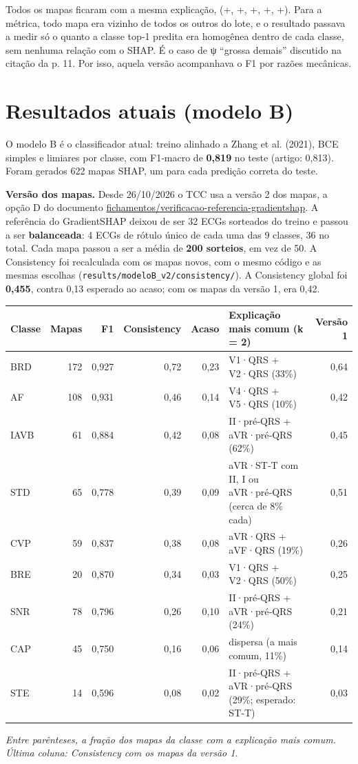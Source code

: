 \documentclass[11pt,a4paper]{article}
\begin{document}
Todos os mapas ficaram com a mesma explicação, (+, +, +, +, +). Para a métrica, todo mapa era vizinho de todos os outros do lote, e o resultado passava a medir só o quanto a classe top‑1 predita era homogênea dentro de cada classe, sem nenhuma relação com o SHAP. É o caso de ψ “grossa demais” discutido na citação da p. 11. Por isso, aquela versão acompanhava o F1 por razões mecânicas.

\section{Resultados atuais (modelo B)}

O modelo B é o classificador atual: treino alinhado a Zhang et al. (2021), BCE simples e limiares por classe, com F1‑macro de \textbf{0,819} no teste (artigo: 0,813). Foram gerados 622 mapas SHAP, um para cada predição correta do teste.

\textbf{Versão dos mapas.} Desde 26/10/2026 o TCC usa a versão 2 dos mapas, a opção D do documento \url{fichamentos/verificacao-referencia-gradientshap}. A referência do GradientSHAP deixou de ser 32 ECGs sorteados do treino e passou a ser \textbf{balanceada}: 4 ECGs de rótulo único de cada uma das 9 classes, 36 no total. Cada mapa passou a ser a média de \textbf{200 sorteios}, em vez de 50. A Consistency foi recalculada com os mapas novos, com o mesmo código e as mesmas escolhas (\texttt{results/modeloB\_v2/consistency/}). A Consistency global foi \textbf{0,455}, contra 0,13 esperado ao acaso; com os mapas da versão 1, era 0,42.

\begin{center}\small
\begin{tabularx}{\linewidth}{lrrrrXr}
\toprule
\textbf{Classe} & \textbf{Mapas} & \textbf{F1} & \textbf{Consistency} & \textbf{Acaso} & \textbf{Explicação mais comum (k = 2)} & \textbf{Versão 1} \\
\midrule
BRD & 172 & 0,927 & 0,72 & 0,23 & V1·QRS + V2·QRS (33\%) & 0,64 \\
AF & 108 & 0,931 & 0,46 & 0,14 & V4·QRS + V5·QRS (10\%) & 0,42 \\
IAVB & 61 & 0,884 & 0,42 & 0,08 & II·pré‑QRS + aVR·pré‑QRS (62\%) & 0,45 \\
STD & 65 & 0,778 & 0,39 & 0,09 & aVR·ST‑T com II, I ou aVR·pré‑QRS (cerca de 8\% cada) & 0,51 \\
CVP & 59 & 0,837 & 0,38 & 0,08 & aVR·QRS + aVF·QRS (19\%) & 0,26 \\
BRE & 20 & 0,870 & 0,34 & 0,03 & V1·QRS + V2·QRS (50\%) & 0,25 \\
SNR & 78 & 0,796 & 0,26 & 0,10 & II·pré‑QRS + aVR·pré‑QRS (24\%) & 0,21 \\
CAP & 45 & 0,750 & 0,16 & 0,06 & dispersa (a mais comum, 11\%) & 0,14 \\
STE & 14 & 0,596 & 0,08 & 0,02 & II·pré‑QRS + aVR·pré‑QRS (29\%; esperado: ST‑T) & 0,03 \\
\bottomrule
\end{tabularx}
\end{center}
\textit{Entre parênteses, a fração dos mapas da classe com a explicação mais comum. Última coluna: Consistency com os mapas da versão 1.}
\end{document}
